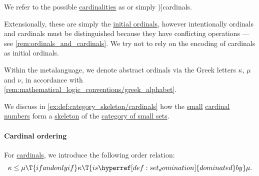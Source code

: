 \begin{definition}\label{def:cardinal}
  We refer to the possible \hyperref[def:cardinality]{cardinalities} as  or simply \term[ru=кардинал (\cite[\S 1.5.12]{КусраевКутателадзе2005БулевозначныйАнализ})]{cardinals}.

  Extensionally, these are simply the \hyperref[def:initial_ordinal]{initial ordinals}, however intentionally ordinals and cardinals must be distinguished because they have conflicting operations --- see \cref{rem:ordinals_and_cardinals}. We try not to rely on the encoding of cardinals as initial ordinals.
\end{definition}
\begin{comments}
  \item Within the metalanguage, we denote abstract ordinals via the Greek letters \( \kappa \), \( \mu \) and \( \nu \), in accordance with \cref{rem:mathematical_logic_conventions/greek_alphabet}.

  \item We discuss in \cref{ex:def:category_skeleton/cardinals} how the \hyperref[def:small_set]{small} \hyperref[def:cardinal]{cardinal numbers} form a \hyperref[def:category_skeleton]{skeleton} of the \hyperref[def:category_of_small_sets]{category of small sets}.
\end{comments}

\paragraph{Cardinal ordering}

\begin{definition}\label{def:cardinal_ordering}
  For \hyperref[def:cardinal]{cardinals}, we introduce the following order relation:
  \begin{equation*}
    \kappa \leq \mu \T{if and only if} \kappa \T{is \hyperref[def:set_domination]{dominated} by} \mu.
  \end{equation*}
\end{definition}

